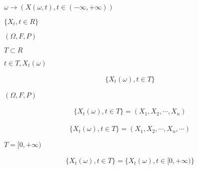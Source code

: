 \begin{preview}
\setcounter{equation}{0}%
\(\omega \rightarrow (X(\omega, t), t \in (-\infty, +\infty))\)
\end{preview}

\begin{preview}
\setcounter{equation}{0}%
\(\{X_t, t \in R\}\)
\end{preview}

\begin{preview}
\setcounter{equation}{0}%
\((\Omega, F, P)\)
\end{preview}

\begin{preview}
\setcounter{equation}{0}%
\(T\subset R\)
\end{preview}

\begin{preview}
\setcounter{equation}{0}%
\(t \in T, X_t(\omega)\)
\end{preview}

\begin{preview}
\setcounter{equation}{0}%
\begin{align}
\{X_t(\omega), t\in T\}
\end{align}

\end{preview}

\begin{preview}
\setcounter{equation}{0}%
\((\Omega, F, P)\)
\end{preview}

\begin{preview}
\setcounter{equation}{0}%
\begin{align}
\{X_t(\omega), t\in T\} = (X_1, X_2, \cdots, X_n)
\end{align}

\end{preview}

\begin{preview}
\setcounter{equation}{0}%
\begin{align}
\{X_t(\omega), t\in T\} = (X_1, X_2, \cdots, X_n, \cdots)
\end{align}

\end{preview}

\begin{preview}
\setcounter{equation}{0}%
\(T=[0, +\infty)\)
\end{preview}

\begin{preview}
\setcounter{equation}{0}%
\begin{align}
\{X_t(\omega), t \in T\} = \{X_t(\omega), t \in [0, +\infty)\}
\end{align}

\end{preview}

